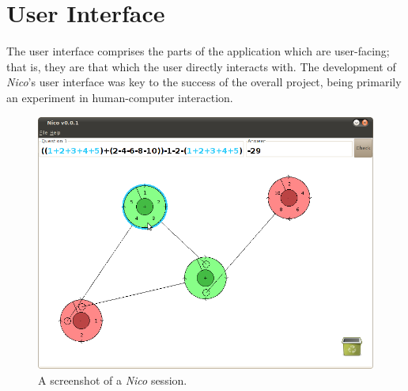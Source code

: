 \documentclass[12pt,twoside,notitlepage,xetex]{report}
\begin{document}
\section{User Interface}%

The user interface comprises the parts of the application which are
user-facing; that is, they are that which the user directly interacts with.
The development of \emph{Nico}'s user interface was key to the success of the
overall project, being primarily an experiment in human-computer interaction.

\begin{center}
\begin{figure}[H]
\begin{center}
\includegraphics[width=\textwidth]{figs/nico_screen_01.png}
\end{center}
\caption{A screenshot of a \emph{Nico} session.}
\label{fig:Nico1}
\end{figure}
\end{center}
\end{document}
